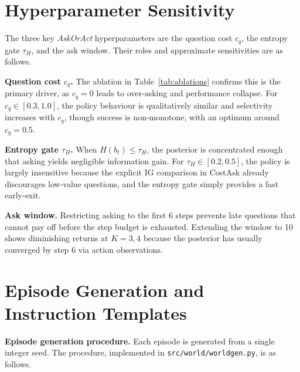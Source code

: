 \documentclass[10pt,twocolumn]{article}
\begin{document}
\section{Hyperparameter Sensitivity}
\label{app:hyperparams}

The three key \textit{AskOrAct} hyperparameters are the question cost $c_q$, the entropy gate $\tau_H$, and the ask window.
Their roles and approximate sensitivities are as follows.

\textbf{Question cost $c_q$.}
The ablation in Table~\ref{tab:ablations} confirms this is the primary driver, as $c_q{=}0$ leads to over-asking and performance collapse.
For $c_q \in [0.3, 1.0]$, the policy behaviour is qualitatively similar and selectivity increases with $c_q$, though success is non-monotone, with an optimum around $c_q{=}0.5$.

\textbf{Entropy gate $\tau_H$.}
When $H(b_t) \leq \tau_H$, the posterior is concentrated enough that asking yields negligible information gain.
For $\tau_H \in [0.2, 0.5]$, the policy is largely insensitive because the explicit IG comparison in CostAsk already discourages low-value questions, and the entropy gate simply provides a fast early-exit.

\textbf{Ask window.}
Restricting asking to the first 6 steps prevents late questions that cannot pay off before the step budget is exhausted.
Extending the window to 10 shows diminishing returns at $K{=}3,4$ because the posterior has usually converged by step 6 via action observations.

\section{Episode Generation and Instruction Templates}
\label{app:episode_gen}

\textbf{Episode generation procedure.}
Each episode is generated from a single integer seed. The procedure, implemented in \texttt{src/world/worldgen.py}, is as follows.
\end{document}
